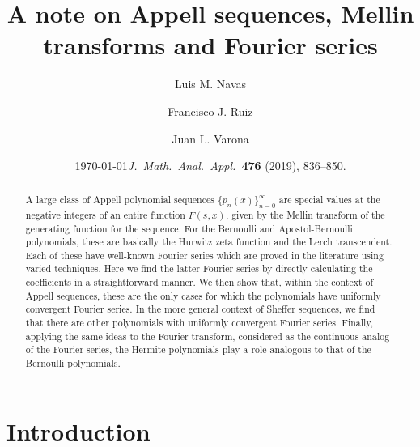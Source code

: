 \documentclass[11pt,a4paper]{amsart}
\date{\today}
\date{\textit{J.\ Math.\ Anal.\ Appl.}\ \textbf{476} (2019), 836--850.}
\title[Appell sequences, Mellin transforms and Fourier series]%
{A note on Appell sequences, Mellin transforms and Fourier series}
\author[L.~M.~Navas]{Luis M. Navas}
\author[F.~J.~Ruiz]{Francisco J. Ruiz}
\author[J.~L.~Varona]{Juan L. Varona}
\theoremstyle{plain}
\theoremstyle{plain}
\theoremstyle{plain}
\theoremstyle{remark}
\begin{document}

\begin{abstract}
A large class of Appell polynomial sequences $\{p_{n}(x)\}_{n=0}^{\infty}$ are special values at the negative integers of an entire function $F(s,x)$, given by the Mellin transform of the generating function for the sequence. For the Bernoulli and Apostol-Bernoulli polynomials, these are basically the Hurwitz zeta function and the Lerch transcendent. Each of these have well-known Fourier series which are proved in the literature using varied techniques.
%
Here we find the latter Fourier series by directly calculating the coefficients in a straightforward manner. We then show that, within the context of Appell sequences, these are the only cases for which the polynomials have uniformly convergent Fourier series.
%
In the more general context of Sheffer sequences, we find that there are other polynomials with uniformly convergent Fourier series. Finally, applying the same ideas to the Fourier transform, considered as the continuous analog of the Fourier series, the Hermite polynomials play a role analogous to that of the Bernoulli polynomials.
\end{abstract}

\maketitle


\section{Introduction}
\end{document}
